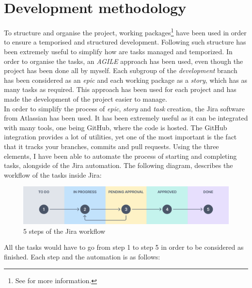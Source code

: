 \documentclass[a4paper, 12pt, oneside]{book}
\begin{document}
\section{Development methodology}
To structure and organise the project, working packages\footnote{See  for more information.} have been used in order to ensure a temporised and structured development. Following such structure has been extremely useful to simplify how are tasks managed and temporized. In order to organise the tasks, an \emph{AGILE} approach has been used, even though the project has been done all by myself. Each subgroup of the \emph{development} branch has been considered as an \emph{epic} and each working package as a \emph{story}, which has as many tasks as required. This approach has been used for each project and has made the development of the project easier to manage.
\\[8pt]
In order to simplify the process of \emph{epic}, \emph{story} and \emph{task} creation, the Jira software from Atlassian has been used. It has been extremely useful as it can be integrated with many tools, one being GitHub, where the code is hosted. The GitHub integration provides a lot of utilities, yet one of the most important is the fact that it tracks your branches, commits and pull requests. Using the three elements, I have been able to automate the process of starting and completing tasks, alongside of the Jira automation. The following diagram, describes the workflow of the tasks inside Jira:
\begin{figure}[H]
	\centering
	\includegraphics[width=\textwidth]{assets/working-packages/JiraWorkflow.png}
	\caption{5 steps of the Jira workflow}
\end{figure}
All the tasks would have to go from step 1 to step 5 in order to be considered as finished. Each step and the automation is as follows:
\end{document}
